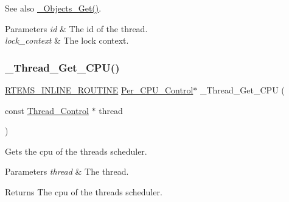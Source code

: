 \begin{DoxySeeAlso}{See also}
\mbox{\hyperlink{group__RTEMSScoreObject_gaccc5682133e4f65b8cb374eab9be2c9d}{\+\_\+\+Objects\+\_\+\+Get()}}.
\end{DoxySeeAlso}

\begin{DoxyParams}{Parameters}
{\em id} & The id of the thread. \\
\hline
{\em lock\+\_\+context} & The lock context. \\
\hline
\end{DoxyParams}
\mbox{\label{group__RTEMSScoreThread_ga04310043b907712ed8693fbbbc6ba0be}} 
\subsubsection{\texorpdfstring{\_Thread\_Get\_CPU()}{\_Thread\_Get\_CPU()}}
{\footnotesize\ttfamily \mbox{\hyperlink{group__RTEMSScoreBaseDefs_gac216239df231d5dbd15e3520b0b9313f}{R\+T\+E\+M\+S\+\_\+\+I\+N\+L\+I\+N\+E\+\_\+\+R\+O\+U\+T\+I\+NE}} \mbox{\hyperlink{structPer__CPU__Control}{Per\+\_\+\+C\+P\+U\+\_\+\+Control}}$\ast$ \+\_\+\+Thread\+\_\+\+Get\+\_\+\+C\+PU (\begin{DoxyParamCaption}\item[{const \mbox{\hyperlink{struct__Thread__Control}{Thread\+\_\+\+Control}} $\ast$}]{thread }\end{DoxyParamCaption})}



Gets the cpu of the thread\textquotesingle{}s scheduler. 


\begin{DoxyParams}{Parameters}
{\em thread} & The thread.\\
\hline
\end{DoxyParams}
\begin{DoxyReturn}{Returns}
The cpu of the thread\textquotesingle{}s scheduler. 
\end{DoxyReturn}
\mbox{\label{group__RTEMSScoreThread_gaade6e27239f8126f2c2848e7e2ec7244}} 
